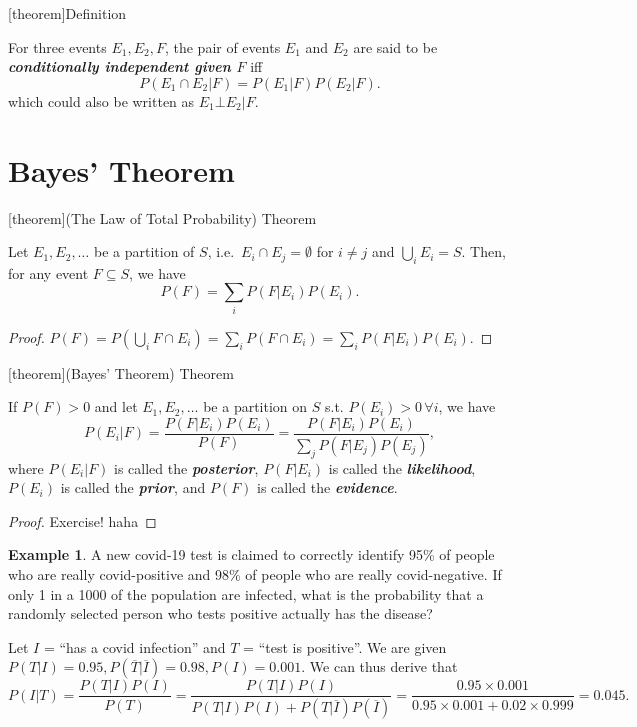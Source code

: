 \documentclass[12pt]{report}
\theoremstyle{definition}
\begin{document}
[theorem]{Definition}
\begin{conditional independence}
    For three events $E_1, E_2, F$, the pair of events $E_1$ and $E_2$ are
    said to be \textbf{\emph{conditionally independent given $F$}} iff
    \[
        P(E_1\cap E_2|F) = P(E_1|F)P(E_2|F).
    \]
    which could also be written as $E_1\bot E_2|F$.
\end{conditional independence}

\section{Bayes' Theorem}

[theorem]{(The Law of
Total Probability) Theorem}
\begin{law of total probability}
    Let $E_1,E_2,\ldots$ be a partition of $S$,
    i.e.\ $E_i\cap E_j=\emptyset$ for $i\neq j$ and $\bigcup_i E_i=S$.
    Then, for any event $F\subseteq
    S$, we have
    \[
        P(F)=\sum_{i}P(F|E_i)P(E_i).
    \] 
\end{law of total probability}
\begin{proof}
    $P(F)=P(\bigcup_i F\cap E_i)=\sum_{i} P(F\cap E_i)=\sum_{i}P(F|E_i)P(E_i)$.
\end{proof} 

[theorem]{(Bayes' Theorem) Theorem}
\begin{bayes' theorem}
    If $P(F)>0$ and let $E_1,E_2,\ldots$ be a partition on $S$ s.t. $P(E_i)>0
    \,\forall i$, we have
    \[
        P(E_i|F)=\frac{P(F|E_i)P(E_i)}{P(F)}
        = \frac{P(F|E_i)P(E_i)}{\sum_{j}P(F|E_j)P(E_j)},
    \]
    where $P(E_i|F)$ is called the \textbf{\emph{posterior}},
    $P(F|E_i)$ is called the \textbf{\emph{likelihood}},
    $P(E_i)$ is called the \textbf{\emph{prior}},
    and $P(F)$ is called the \textbf{\emph{evidence}}.
\end{bayes' theorem}
\begin{proof}
    Exercise! haha
\end{proof} 

\newtheorem{bayes' theorem eg}[theorem]{Example}
\begin{bayes' theorem eg}
    A new covid-19 test is claimed to correctly identify 95\% of people who are
    really covid-positive and 98\% of people who are really covid-negative.
    If only 1 in a 1000 of the population are infected, what is the probability
    that a randomly selected person who tests positive actually has the disease?

    \medskip
    Let $I$ = ``has a covid infection'' and $T$ = ``test is positive''.
    We are given $P(T|I)=0.95,P(\overline{T}|\overline{I})=0.98,P(I)=0.001$.
    We can thus derive that
    \[
        P(I|T)=\frac{P(T|I)P(I)}{P(T)}
        =\frac{P(T|I)P(I)}{P(T|I)P(I)+P(T|\overline{I})P(\overline{I})}
        = \frac{0.95\times 0.001}{0.95\times 0.001 + 0.02\times 0.999}
        = 0.045.
    \]
\end{bayes' theorem eg}
\end{document}
